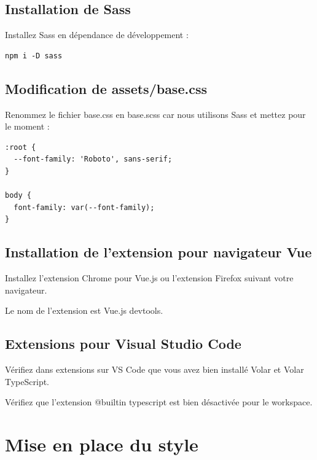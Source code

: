 \documentclass{article}
\begin{document}
\subsection{Installation de {\color{monOrange}Sass}}
Installez Sass en dépendance de développement :
\begin{verbatim}
npm i -D sass
\end{verbatim}

\subsection{Modification de {\color{monOrange}assets/base.css}}
Renommez le fichier {\color{monOrange}base.css} en {\color{monOrange}base.scss} car nous utilisons {\color{monOrange}Sass} et mettez pour le moment :
\begin{verbatim}
:root {
  --font-family: 'Roboto', sans-serif;
}

body {
  font-family: var(--font-family);
}
\end{verbatim}

\subsection{Installation de l'extension pour navigateur {\color{monOrange}Vue}}
Installez l'extension Chrome pour Vue.js ou l'extension Firefox suivant votre navigateur.

Le nom de l'extension est Vue.js devtools.

\subsection{Extensions pour {\color{monOrange}Visual Studio Code}}
Vérifiez dans extensions sur VS Code que vous avez bien installé Volar et Volar TypeScript.

Vérifiez que l'extension {\color{monOrange}@builtin typescript} est bien désactivée pour le {\color{monOrange}workspace}.



\section{Mise en place du style}
\end{document}
